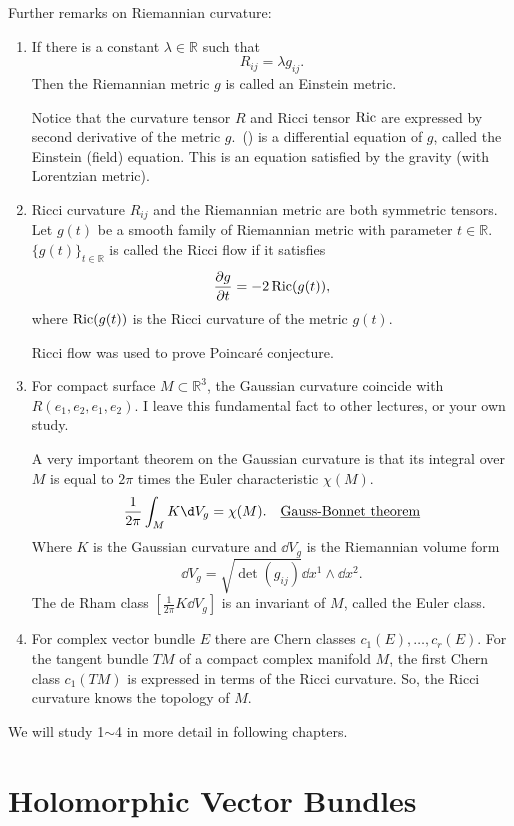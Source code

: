 \documentclass[12pt]{article}
\begin{document}
Further remarks on Riemannian curvature:
\begin{enumerate}[1.]
\item If there is a constant  \(\lambda\in \mathbb{R}\) such that
  \begin{equation*}
    R_{ij}=\lambda g_{ij} \tag{\ast}
  .\end{equation*}
  Then the Riemannian metric \(g\) is called an Einstein metric.

  Notice that the curvature tensor \(R\) and Ricci tensor \(\operatorname{Ric}\) are expressed by
  second derivative of the metric \(g\).\ (\ast) is a differential equation of \(g\),
  called the Einstein (field) equation. This is an equation satisfied by the
    gravity (with Lorentzian metric).
\item Ricci curvature \(R_{ij}\) and the Riemannian metric are both symmetric tensors.
  Let \(g(t)\) be a smooth family of Riemannian metric with parameter \(t\in
  \mathbb{R}\). \(\{g(t)\}_{t\in \mathbb{R}}\) is called the Ricci flow if it
  satisfies \[
    \pdv{g}{t}=-2\operatorname{Ric}(g(t))
  ,\] where \(\operatorname{Ric}(g(t))\) is the Ricci curvature of the metric \(g(t)\).

  Ricci flow was used to prove Poincaré conjecture.
\item For compact surface \(M\subset \mathbb{R}^3\), the Gaussian curvature coincide
  with \(R(e_1,e_2,e_1,e_2)\). I leave this fundamental fact to other lectures, or
  your own study.

  A very important theorem on the Gaussian curvature is that its integral over \(M\)
  is equal to \(2\pi\) times the Euler characteristic \(\chi(M)\). \[
    \frac{1}{2\pi}\int_{M}K\dd{V_g}=\chi(M).
    \quad\text{\underline{Gauss-Bonnet theorem}}
  \] Where \(K\) is the Gaussian curvature and \(\dd{V_g}\) is the Riemannian volume
  form \[
    \dd{V_g}=\sqrt{\det(g_{ij})}\dd{x^1}\wedge \dd{x^2}
  .\] The de Rham class \(\left[\frac{1}{2\pi}K\dd{V_g}\right]\) is an invariant
  of \(M\), called the Euler class.
\item For complex vector bundle \(E\) there are Chern classes \(c_1(E),\ldots,
  c_r(E)\). For the tangent bundle \(TM\) of a compact complex manifold \(M\), the 
  first Chern class \(c_1(TM)\) is expressed in terms of the Ricci curvature.
  So, the Ricci curvature knows the topology of \(M\).
\end{enumerate}
We will study 1\(\sim\)4 in more detail in following chapters.

\ifdefined\FullBook{}
  \chapter{Holomorphic Vector Bundles}
\end{document}
